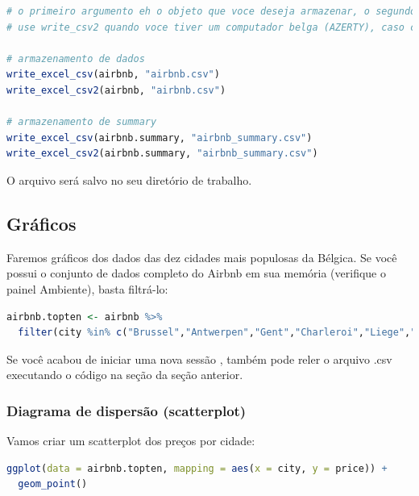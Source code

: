 \documentclass{article}
\begin{document}
\begin{lstlisting}[language=R]
# o primeiro argumento eh o objeto que voce deseja armazenar, o segundo eh o nome que voce deseja atribuir ao arquivo (nao esqueca a extensao .csv)
# use write_csv2 quando voce tiver um computador belga (AZERTY), caso contrário, os números decimais não serão armazenados como números

# armazenamento de dados
write_excel_csv(airbnb, "airbnb.csv")
write_excel_csv2(airbnb, "airbnb.csv")

# armazenamento de summary
write_excel_csv(airbnb.summary, "airbnb_summary.csv")
write_excel_csv2(airbnb.summary, "airbnb_summary.csv")
\end{lstlisting}

O arquivo será salvo no seu diretório de trabalho.

\subsection{Gráficos}

Faremos gráficos dos dados das dez cidades mais populosas da Bélgica. Se você possui o conjunto de dados completo do Airbnb em sua memória (verifique o painel Ambiente), basta filtrá-lo:

\begin{lstlisting}[language=R]
airbnb.topten <- airbnb %>% 
  filter(city %in% c("Brussel","Antwerpen","Gent","Charleroi","Liege","Brugge","Namur","Leuven","Mons","Aalst")) # lembre-se de que voce tera que carregar o pacote Hmisc para usar o operador %in%.
\end{lstlisting}

Se você acabou de iniciar uma nova sessão \faRProject, também pode reler o arquivo .csv executando o código na seção da seção anterior.


\subsubsection{Diagrama de dispersão (scatterplot)}

Vamos criar um scatterplot dos preços por cidade:

\begin{lstlisting}[language=R]
ggplot(data = airbnb.topten, mapping = aes(x = city, y = price)) + 
  geom_point()
\end{lstlisting}
\end{document}
